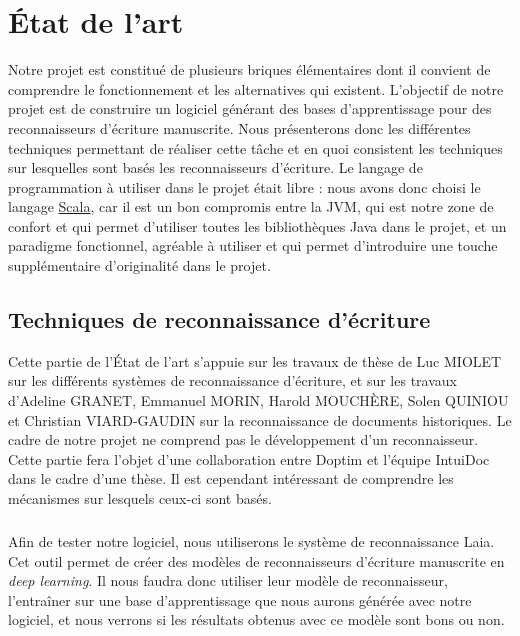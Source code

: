 \hypertarget{c5}{\chapter{État de l'art}}

Notre projet est constitué de plusieurs briques élémentaires dont il convient de comprendre
le fonctionnement et les alternatives qui existent. L'objectif de notre projet est de construire
un logiciel générant des bases d'apprentissage pour des reconnaisseurs d'écriture manuscrite.
Nous présenterons donc les différentes techniques permettant de réaliser cette tâche et en quoi
consistent les techniques sur lesquelles sont basés les reconnaisseurs d'écriture. Le langage de
programmation à utiliser dans le projet était libre : nous avons donc choisi le langage
\href{http://scala-lang.org}{Scala}, car il est un bon compromis entre la JVM, qui est notre zone
de confort et qui permet d'utiliser toutes les bibliothèques Java dans le projet, et un paradigme
fonctionnel, agréable à utiliser et qui permet d'introduire une touche supplémentaire d'originalité
dans le projet.

\section{Techniques de reconnaissance d'écriture}

Cette partie de l'État de l'art s'appuie sur les travaux de thèse de Luc MIOLET sur les différents
systèmes de reconnaissance d'écriture, et sur les travaux d'Adeline GRANET, Emmanuel MORIN, Harold MOUCHÈRE,
Solen QUINIOU et Christian VIARD-GAUDIN sur la reconnaissance de documents historiques. Le cadre de notre
projet ne comprend pas le développement d'un reconnaisseur. Cette partie fera l'objet d'une collaboration
entre Doptim et l'équipe IntuiDoc dans le cadre d'une thèse. Il est cependant intéressant de comprendre
les mécanismes sur lesquels ceux-ci sont basés.

\paragraph{}
Afin de tester notre logiciel, nous utiliserons le système de reconnaissance Laia. Cet outil permet
de créer des modèles de reconnaisseurs d'écriture manuscrite en \textit{deep learning}. Il nous
faudra donc utiliser leur modèle de reconnaisseur, l'entraîner sur une base d'apprentissage que nous aurons
générée avec notre logiciel, et nous verrons si les résultats obtenus avec ce modèle sont bons ou non. 

